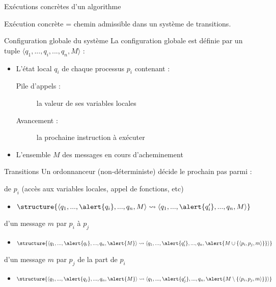 
\begingroup

\begin{frame}{Exécutions concrètes d'un algorithme}

  Exécution concrète = chemin admissible dans un système de transitions.

  \begin{block}{Configuration globale du système}
    La \alert{configuration globale} est définie par un tuple \alert{$\langle q_1, ..., q_i, ..., q_n, M \rangle$} :
    \begin{itemize}
    \item L'état local \alert{$q_i$} de chaque processus $p_i$ contenant :
      \begin{description}
      \item[Pile d'appels :] la valeur de ses variables locales
      \item[Avancement :] la prochaine instruction à exécuter
      \end{description}
    \item L'ensemble \alert{$M$} des messages en cours d'acheminement
    \end{itemize}
  \end{block}

  \begin{block}{Transitions}
    Un \alert{ordonnanceur} (non-déterministe) décide le prochain pas parmi :
    \begin{description}[Réception]
    \item[Pas local] de $p_i$ (accès aux variables locales, appel de fonctions, etc)
      \begin{itemize}
      \item $\structure{\langle q_1, ..., \alert{q_i}, ..., q_n, M \rangle \leadsto \langle q_1, ..., \alert{q_i'}, ..., q_n, M \rangle}$
      \end{itemize}
    \item[Envoi] d'un message $m$ par $p_i$ à $p_j$
      \begin{itemize}
      \item $\structure{\langle q_1, ..., \alert{q_i}, ..., q_n, \alert{M} \rangle \leadsto \langle q_1, ..., \alert{q_i'}, ..., q_n, \alert{M \cup \{\langle p_i, p_j, m \rangle\}} \rangle}$
      \end{itemize}
    \item[Réception] d'un message $m$ par $p_j$ de la part de $p_i$ 
      \begin{itemize}
      \item $\structure{\langle q_1, ..., \alert{q_j}, ..., q_n, \alert{M} \rangle \leadsto \langle q_1, ..., \alert{q_j'}, ..., q_n, \alert{M \setminus \{\langle p_i, p_j, m \rangle\}} \rangle}$
      \end{itemize}
    \end{description}
  \end{block}

\end{frame}

\endgroup
\endinput
